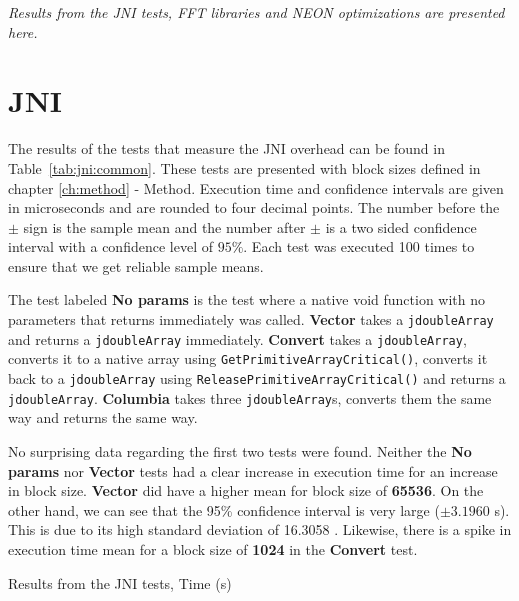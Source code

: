 \textit{Results from the JNI tests, FFT libraries and NEON optimizations are presented here.}

\section{JNI}
The results of the tests that measure the JNI overhead can be found in Table~\ref{tab:jni:common}. These tests are presented with block sizes defined in chapter \ref{ch:method} - Method. Execution time and confidence intervals are given in microseconds and are rounded to four decimal points. The number before the $\pm$ sign is the sample mean and the number after $\pm$ is a two sided confidence interval with a confidence level of $95\%$. Each test was executed 100 times to ensure that we get reliable sample means.

The test labeled \textbf{No params} is the test where a native void function with no parameters that returns immediately was called. \textbf{Vector} takes a \texttt{jdoubleArray} and returns a \texttt{jdoubleArray} immediately. \textbf{Convert} takes a \texttt{jdoubleArray}, converts it to a native array using \texttt{GetPrimitiveArrayCritical()}, converts it back to a \texttt{jdoubleArray} using \texttt{ReleasePrimitiveArrayCritical()} and returns a \texttt{jdoubleArray}. \textbf{Columbia} takes three \texttt{jdoubleArray}s, converts them the same way and returns the same way.

No surprising data regarding the first two tests were found. Neither the \textbf{No params} nor \textbf{Vector} tests had a clear increase in execution time for an increase in block size. \textbf{Vector} did have a higher mean for block size of \textbf{65536}. On the other hand, we can see that the 95\% confidence interval is very large ($\pm 3.1960$ \textmu s). This is due to its high standard deviation of 16.3058 . Likewise, there is a spike in execution time mean for a block size of \textbf{1024} in the \textbf{Convert} test.



\begin{table}[H]
    \centering
    \caption{Results from the JNI tests, Time (\textmu s)}
    \label{tab:jni:common}
    
\end{table}



